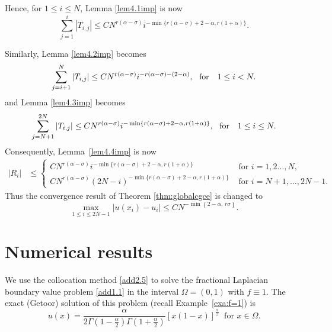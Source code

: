 \documentclass[smallextended]{svjour3}       %
\begin{document}
\begin{remark}
Hence, for $1\leq i \leq N$, Lemma \ref{lem4.1imp} is now
	\begin{equation*}%
		\sum_{j=1}^{i}{|T_{i,j}|} 
\leq C N^{r \left(\alpha-\sigma \right)} i^{-\min \{r \left(\alpha-\sigma\right) + 2-\alpha, r \left(1+\alpha\right) \} }.
	\end{equation*}
	
Similarly, Lemma \ref{lem4.2imp} becomes
	\begin{equation*}
		\sum_{j=i+1}^{N} |T_{i,j}| 
\leq C N^{r \left(\alpha-\sigma \right)} i^{-r(\alpha-\sigma)-(2-\alpha)},~~{\rm for}\quad 1\le i< N .
	\end{equation*}
	and  Lemma \ref{lem4.3imp} becomes
	\begin{equation*}
		\sum_{j=N+1}^{2N}{|T_{i,j}|} 
\leq C N^{r \left(\alpha-\sigma \right)} i^{-\min \{r(\alpha-\sigma)+2-\alpha , r(1+\alpha)\} }
,~~{\rm for}\quad 1\le i\le N .
	\end{equation*}
Consequently, Lemma~\ref{lem4.4imp}  is now
	\begin{align*}
		|R_i| %
		& \leq
		\begin{cases}
			CN^{r \left(\alpha-\sigma \right)} i^{-\min \{r(\alpha-\sigma)+2-\alpha , r(1+\alpha)\} }
			&\text{ for } i=1,2\dots, N, \\
			CN^{r \left(\alpha-\sigma \right)} (2N-i)^{-\min \{r(\alpha-\sigma)+2-\alpha , r(1+\alpha)\} }
			&\text{ for } i=N+1,\dots, 2N-1.
		\end{cases}
	\end{align*}
Thus the convergence result of Theorem \ref{thm:globalcgce} is changed to
	\[\max_{1\leq i \leq 2N-1} |u(x_{i})-u_{i}| \le CN^{-\min\left\{2-\alpha,\,r\sigma\right\}}.\]
\end{remark}


%
%
\section{Numerical results}\label{sec:numerical}

We use the collocation method \eqref{add2.5} to solve the  fractional Laplacian  boundary value problem  \eqref{add1.1} in the interval $\Omega=(0,1)$ with $f\equiv1$.
The exact (Getoor) solution  \cite{Getoor1961,HuangO:14} of this problem (recall Example~\ref{exa:f=1}) is
\begin{equation}\label{Getoor}
	u(x)=\frac{\alpha }{2\varGamma \left( 1-\frac{\alpha}{2} \right) \varGamma \left( 1+\frac{\alpha}{2} \right)}\left[ x\left( 1-x \right) \right] ^{\frac{\alpha}{2}}\ \text{ for }x\in\Omega.
\end{equation}
\end{document}
